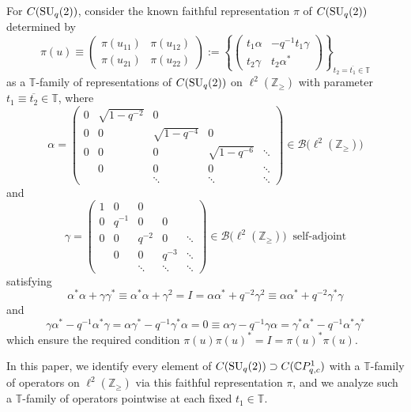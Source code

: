 For $C ( {\rm SU}_{q}(2) ) $, consider the known faithful
representation $\pi$ of $C ( {\rm SU}_{q}(2) ) $
determined by
\[
\pi(u) \equiv\left(
\begin{matrix}
\pi ( u_{11} ) & \pi ( u_{12} ) \\
\pi ( u_{21} ) & \pi ( u_{22} )
\end{matrix}
\right) :=\left\{ \left(
\begin{matrix}
t_{1}\alpha & -q^{-1}t_{1}\gamma\\
t_{2}\gamma & t_{2}\alpha^{\ast}%
\end{matrix}
\right) \right\} _{t_{2}=\overline{t_{1}}\in\mathbb{T}}%
\]
as a $\mathbb{T}$-family of representations of $C( {\rm SU}_{q}(2) ) $ on $\ell^{2} ( \mathbb{Z}_{\geq}) $ with
parameter $t_{1}\equiv\overline{t_{2}}\in\mathbb{T}$, where
\[
\alpha=\left(
\begin{matrix}
0 & \sqrt{1-q^{-2}} & 0 & & \\
0 & 0 & \sqrt{1-q^{-4}} & 0 & \\
0 & 0 & 0 & \sqrt{1-q^{-6}} & \ddots\\
& 0 & 0 & 0 & \ddots\\
& & \ddots & \ddots & \ddots
\end{matrix}
\right) \in\mathcal{B}\big( \ell^{2}( \mathbb{Z}_{\geq})\big)
\]
and
\[
\gamma=\left(
\begin{matrix}
1 & 0 & 0 & & \\
0 & q^{-1} & 0 & 0 & \\
0 & 0 & q^{-2} & 0 & \ddots\\
& 0 & 0 & q^{-3} & \ddots\\
& & \ddots & \ddots & \ddots
\end{matrix}
\right) \in\mathcal{B}\big( \ell^{2} ( \mathbb{Z}_{\geq} )
\big) \ \text{\ \ self-adjoint}
\]
satisfying
\[
\alpha^{\ast}\alpha+\gamma\gamma^{\ast}\equiv\alpha^{\ast}\alpha+\gamma
^{2}=I=\alpha\alpha^{\ast}+q^{-2}\gamma^{2}\equiv\alpha\alpha^{\ast}%
+q^{-2}\gamma^{\ast}\gamma
\]
and
\[
\gamma\alpha^{\ast}-q^{-1}\alpha^{\ast}\gamma=\alpha\gamma^{\ast}-q^{-1}%
\gamma^{\ast}\alpha=0\equiv\alpha\gamma-q^{-1}\gamma\alpha=\gamma^{\ast}%
\alpha^{\ast}-q^{-1}\alpha^{\ast}\gamma^{\ast}%
\]
which ensure the required condition $\pi(u) \pi(u)
^{\ast}=I=\pi(u) ^{\ast}\pi(u) $.

In this paper, we identify every element of $C( {\rm SU}_{q}(2)
) \supset C ( \mathbb{C}P_{q,c}^{1} ) $ with a $\mathbb{T}$-family of operators on $\ell^{2} ( \mathbb{Z}_{\geq} ) $ via this
faithful representation $\pi$, and we analyze such a $\mathbb{T}$-family of
operators pointwise at each fixed $t_{1}\in\mathbb{T}$.

